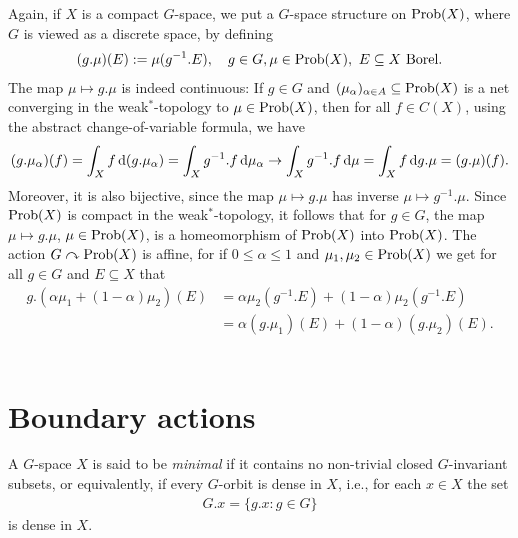 Again, if $X$ is a compact $G$-space, we put a $G$-space structure on $\operatorname{Prob}(X)$, where $G$ is viewed as a discrete space, by defining
\begin{align*}
(g .\mu)(E):=\mu(g^{-1}.E), \quad g \in G, \mu \in \operatorname{Prob}(X),\ E \subseteq X\text{ Borel}.
\end{align*}
The map $\mu \mapsto g.\mu$ is indeed continuous: If $g \in G$  and $(\mu_{\alpha})_{\alpha \in A} \subseteq \operatorname{Prob}(X) $ is a net converging in the weak$^*$-topology to $\mu \in \operatorname{Prob}(X)$, then for all $f \in C(X)$, using the abstract change-of-variable formula, we have
\begin{align*}
(g.\mu _{\alpha})(f) = \int_{X} f \mathop{}\!\mathrm{d} (g.\mu_{\alpha}) =\int_{X} g^{-1}.f \mathop{}\!\mathrm{d} \mu _{\alpha} \to \int_{X} g^{-1}. f \mathop{}\!\mathrm{d} \mu = \int_{X} f \mathop{}\!\mathrm{d} g.\mu =(g.\mu)(f).
\end{align*}
Moreover, it is also bijective, since the map $\mu \mapsto g.\mu$ has inverse $\mu \mapsto g^{-1}.\mu$. Since $\operatorname{Prob}(X)$ is compact in the weak$^*$-topology, it follows that for $g \in G$, the map $\mu \mapsto g.\mu$, $\mu \in \operatorname{Prob}(X)$, is a homeomorphism of $\operatorname{Prob}(X)$ into $\operatorname{Prob}(X)$. The action $G \curvearrowright \operatorname{Prob}(X)$ is affine, for if $0\leq \alpha \leq 1$ and $\mu_1, \mu_2 \in \operatorname{Prob}(X)$ we get for all $g \in G$ and $E \subseteq X$ that
\begin{align*}
g .(\alpha \mu_1 + (1-\alpha)\mu_2)(E)&=\alpha \mu_2(g^{-1}.E) + (1-\alpha) \mu_2(g^{-1}.E)\\
&=\alpha(g. \mu_1)(E)+(1-\alpha)(g.\mu_2)(E).
\end{align*}\

\section{Boundary actions}
\begin{definition}\label{minimal}
A $G$-space $X$ is said to be \emph{minimal} if it contains no non-trivial closed $G$-invariant subsets, or equivalently, if every $G$-orbit is dense in $X$, i.e., for each $x \in X$ the set
\begin{align*}
G.x=\{ g.x : g \in G\}
\end{align*}
is dense in $X$.
\end{definition}

